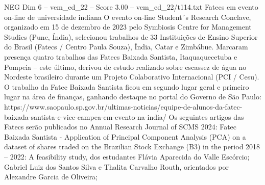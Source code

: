 \begin{textsample}{NEG Dim 6 – vem\_ed\_22 – Score 3.00 – vem\_ed\_22/t114.txt}  \label{ex:f6_neg_115}
Fatecs em evento on-line de universidade indiana O evento on-line Student´s Research Conclave, organizado em 15 de dezembro de 2023 pelo Symbiosis Centre for Management Studies (Pune, Índia), selecionou trabalhos de 33 Instituições de Ensino Superior do Brasil (Fatecs / Centro Paula Souza), Índia, Catar e Zimbábue.
Marcaram presença quatro trabalhos das Fatecs Baixada Santista, Itaquaquecetuba e Pompeia – este último, derivou de estudo realizado sobre escassez de água no Nordeste brasileiro durante um Projeto Colaborativo Internacional (PCI / Cesu).
O trabalho da Fatec Baixada Santista ficou em segundo lugar geral e primeiro lugar na área de finanças, ganhando destaque no portal do Governo de São Paulo: https://www.saopaulo.sp.gov.br/ultimas-noticias/equipe-de-alunos-da-fatec-baixada-santista-e-vice-campea-em-evento-na-india/ Os seguintes artigos das Fatecs serão publicados no Annual Research Journal of SCMS 2024: Fatec Baixada Santista - Application of Principal Component Analysis (PCA) on a dataset of shares traded on the Brazilian Stock Exchange (B3) in the period 2018 – 2022: A feasibility study, dos estudantes Flávia Aparecida do Valle Escórcio; Gabriel Luiz dos Santos Silva e Thalita Carvalho Routh, orientados por Alexandre Garcia de Oliveira;

\end{textsample}
